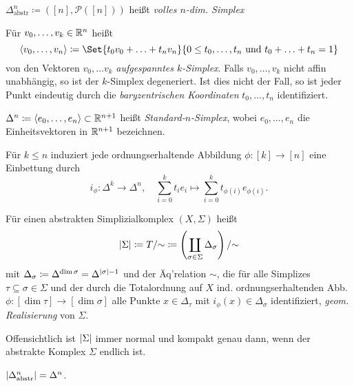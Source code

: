 \documentclass{cheat-sheet}
\newcommand{\Pow}{\mathcal{P}} %
\begin{document}
\begin{defn}
  $\Delta^n_{\text{abstr}} \coloneqq ([n], \Pow([n]))$ heißt \emph{volles $n$-dim. Simplex}
\end{defn}

\begin{defn}
  Für $v_0, \ldots, v_k \in \mathbb{R}^n$ heißt
  \[ \langle v_0, \ldots, v_n \rangle \coloneqq \Set{ t_0 v_0 + \ldots + t_n v_n }{ 0 \leq t_0, \ldots, t_n \text{ und } t_0 + \ldots + t_n = 1 } \]
  von den Vektoren $v_0, \ldots v_k$ \emph{aufgespanntes $k$-Simplex}. Falls $v_0, \ldots, v_k$ nicht affin unabhängig, so ist der $k$-Simplex degeneriert. Ist dies nicht der Fall, so ist jeder Punkt eindeutig durch die \emph{baryzentrischen Koordinaten} $t_0, \ldots, t_n$ identifiziert.
\end{defn}

\begin{defn}
  $\Delta^n \coloneqq \langle e_0, \ldots, e_n \rangle \subset \mathbb{R}^{n+1}$ heißt \emph{Standard-$n$-Simplex}, wobei $e_0, \ldots, e_n$ die Einheitsvektoren in $\mathbb{R}^{n+1}$ bezeichnen.
\end{defn}

\begin{bem}
  Für $k \leq n$ induziert jede ordnungserhaltende Abbildung $\phi : [k] \to [n]$ eine Einbettung durch
  \[ i_\phi : \Delta^k \to \Delta^n, \quad \sum_{i=0}^k t_i e_i \mapsto \sum_{i=0}^k t_{\phi(i)} e_{\phi(i)}. \]
\end{bem}

\begin{defn}
  Für einen abstrakten Simplizialkomplex $(X, \Sigma)$ heißt
  \[ \lvert\Sigma\rvert \coloneqq T / {\sim} \coloneqq \left( \coprod_{\sigma \in \Sigma} \Delta_\sigma \right) / {\sim} \]
  mit $\Delta_\sigma \coloneqq \Delta^{\dim \sigma} = \Delta^{\lvert\sigma\rvert - 1}$ und der Äq'relation ${\sim}$, die für alle Simplizes $\tau \subseteq \sigma \in \Sigma$ und der durch die Totalordnung auf $X$ ind. ordnungserhaltenden Abb. $\phi : [ \dim \tau ] \to [ \dim \sigma ]$ alle Punkte $x \in \Delta_\tau$ mit $i_\phi(x) \in \Delta_{\sigma}$ identifiziert, \emph{geom. Realisierung} von $\Sigma$.
\end{defn}

\begin{bem}
  Offensichtlich ist $\lvert\Sigma\rvert$ immer normal und kompakt genau dann, wenn der abstrakte Komplex $\Sigma$ endlich ist.
\end{bem}

\begin{prop}
  $\lvert\Delta^n_{\text{abstr}}\rvert = \Delta^n$.
\end{prop}
\end{document}

